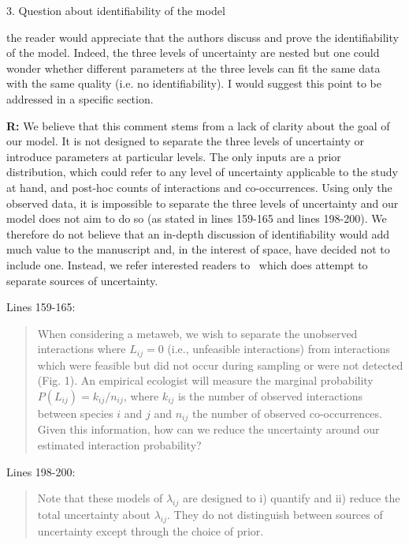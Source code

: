 \documentclass[12pt]{letter}
\newenvironment{refquote}{\bigskip \begin{it}}{\end{it}\smallskip}
\begin{document}
	3. Question about identifiability of the model


		\begin{refquote}

			the reader would appreciate that the authors discuss and prove the identifiability of the model. Indeed, the three levels of uncertainty are nested but one could wonder whether different parameters at the three levels can fit the same data with the same quality (i.e. no identifiability).  I would suggest this point to be addressed in a specific section.

		\end{refquote}


		\textbf{R:} We believe that this comment stems from a lack of clarity about the goal of our model. It is not designed to separate the three levels of uncertainty or introduce parameters at particular levels. The only inputs are a prior distribution, which could refer to any level of uncertainty applicable to the study at hand, and post-hoc counts of interactions and co-occurrences. Using only the observed data, it is impossible to separate the three levels of uncertainty and our model does not aim to do so (as stated in lines 159-165 and lines 198-200). We therefore do not believe that an in-depth discussion of identifiability would add much value to the manuscript and, in the interest of space, have decided not to include one. Instead, we refer interested readers to~\citet{Weinstein2017} which does attempt to separate sources of uncertainty.


		Lines 159-165:


		\begin{quotation}
			When considering a metaweb, we wish to separate the unobserved interactions where $L_{ij}=0$ (i.e., unfeasible interactions) from interactions which were feasible but did not occur during sampling or  were not detected (Fig. 1). An empirical ecologist will measure the marginal probability $P(L_{ij})=k_{ij}/n_{ij}$, where $k_{ij}$ is the number of observed interactions between species $i$ and $j$ and $n_{ij}$ the number of observed co-occurrences. Given this information, how can we reduce the uncertainty around our estimated interaction probability?
		\end{quotation}


		Lines 198-200:


		\begin{quotation}
			 Note that these models of $\lambda_{ij}$ are designed to i) quantify and ii) reduce the total uncertainty about $\lambda_{ij}$. They do not distinguish between sources of uncertainty except through the choice of prior.
		\end{quotation}
\end{document}
